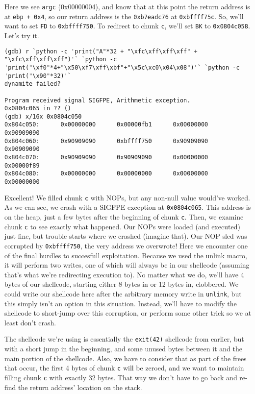 Here we see \texttt{argc} (0x00000004), and know that at this point the return
address is at \texttt{ebp + 0x4}, so our return address is the \texttt{0xb7eadc76}
at \texttt{0xbffff75c}. So, we'll want to set \texttt{FD} to \texttt{0xbffff750}.
To redirect to chunk \texttt{c}, we'll set \texttt{BK} to \texttt{0x0804c058}.
Let's try it.

\begin{lstlisting}
(gdb) r `python -c 'print("A"*32 + "\xfc\xff\xff\xff" + "\xfc\xff\xff\xff")'` `python -c 'print("\xf0"*4+"\x50\xf7\xff\xbf"+"\x5c\xc0\x04\x08")'` `python -c 'print("\x90"*32)'`
dynamite failed?

Program received signal SIGFPE, Arithmetic exception.
0x0804c065 in ?? ()
(gdb) x/16x 0x0804c050
0x804c050:      0x00000000      0x00000fb1      0x00000000      0x90909090
0x804c060:      0x90909090      0xbffff750      0x90909090      0x90909090
0x804c070:      0x90909090      0x90909090      0x00000000      0x00000f89
0x804c080:      0x00000000      0x00000000      0x00000000      0x00000000
\end{lstlisting}

Excellent! We filled chunk \texttt{c} with NOPs, but any non-null value would've worked.
As we can see, we crash with a SIGFPE exception at \texttt{0x0804c065}. This address is
on the heap, just a few bytes after the beginning of chunk \texttt{c}. Then, we examine
chunk \texttt{c} to see exactly what happened. Our NOPs were loaded (and executed) just
fine, but trouble starts where we crashed (imagine that). Our NOP sled was corrupted
by \texttt{0xbffff750}, the very address we overwrote! Here we encounter one of the
final hurdles to succesfull exploitation. Because we used the unlink macro, it will
perform two writes, one of which will always be in our shellcode (assuming that's what
we're redirecting execution to). No matter what we do, we'll have 4 bytes of our shellcode,
starting either 8 bytes in or 12 bytes in, clobbered. We could write our shellcode
here after the arbitrary memory write in \texttt{unlink}, but this simply isn't
an option in this situation. Instead, we'll have to modify the shellcode to
short-jump over this corruption, or perform some other trick so we at least
don't crash.

The shellcode we're using is essentially the \texttt{exit(42)} shellcode from earlier,
but with a short jump in the beginning, and some unused bytes between it and the
main portion of the shellcode. Also, we have to consider that as part
of the frees that occur, the first 4 bytes of chunk \texttt{c} will be zeroed, and
we want to maintain filling chunk \texttt{c} with exactly 32 bytes. That way we
don't have to go back and re-find the return address' location on the stack.

